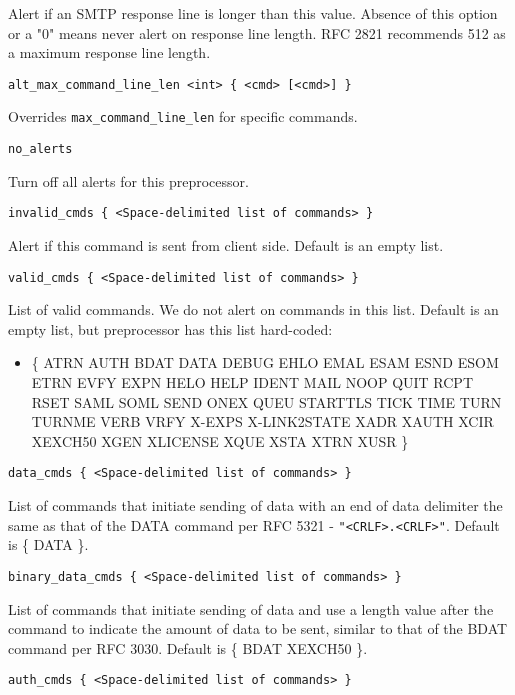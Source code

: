\documentclass[english]{report}
\newcounter{slistnum}
\newenvironment{slist}
{ \begin{list}{ {\bf \arabic{slistnum}.} }{\usecounter{slistnum} } }
{ \end{list} }
\begin{document}
\begin{slist}
Alert if an SMTP response line is longer than this value.  Absence of this
option or a "0" means never alert on response line length.  RFC 2821 recommends
512 as a maximum response line length.

\item \texttt{alt\_max\_command\_line\_len <int> \{ <cmd> [<cmd>] \}}

Overrides \texttt{max\_command\_line\_len} for specific commands.

\item \texttt{no\_alerts}

Turn off all alerts for this preprocessor.

\item \texttt{invalid\_cmds \{ <Space-delimited list of commands> \}}

Alert if this command is sent from client side.  Default is an empty list.

\item \texttt{valid\_cmds \{ <Space-delimited list of commands> \}}

List of valid commands.  We do not alert on commands in this list.  Default is
an empty list, but preprocessor has this list hard-coded:

\begin{itemize}
\item[]
\{ ATRN AUTH BDAT DATA DEBUG EHLO EMAL ESAM ESND ESOM ETRN EVFY EXPN
HELO HELP IDENT MAIL NOOP QUIT RCPT RSET SAML SOML SEND ONEX QUEU
STARTTLS TICK TIME TURN TURNME VERB VRFY X-EXPS X-LINK2STATE
XADR XAUTH XCIR XEXCH50 XGEN XLICENSE XQUE XSTA XTRN XUSR \}
\end{itemize}

\item \texttt{data\_cmds \{ <Space-delimited list of commands> \}}

List of commands that initiate sending of data with an end of data delimiter
the same as that of the DATA command per RFC 5321 - \texttt{"<CRLF>.<CRLF>"}.
Default is \{ DATA \}.

\item \texttt{binary\_data\_cmds \{ <Space-delimited list of commands> \}}

List of commands that initiate sending of data and use a length value after
the command to indicate the amount of data to be sent, similar to that of the
BDAT command per RFC 3030.  Default is \{ BDAT XEXCH50 \}.

\item \texttt{auth\_cmds \{ <Space-delimited list of commands> \}}


\end{slist}
\end{document}
